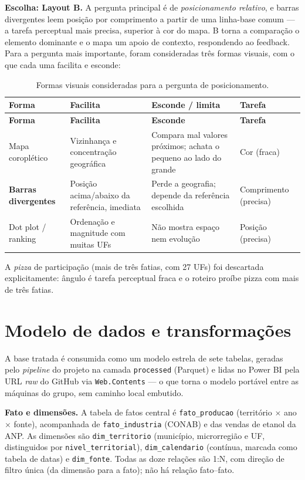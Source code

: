 \documentclass[11pt,a4paper]{article}
\begin{document}
\textbf{Escolha: Layout B.} A pergunta principal é de \textit{posicionamento relativo}, e barras
divergentes leem posição por comprimento a partir de uma linha-base comum — a tarefa perceptual
mais precisa, superior à cor do mapa. B torna a comparação o elemento dominante e o mapa um apoio
de contexto, respondendo ao feedback. Para a pergunta mais importante, foram consideradas três
formas visuais, com o que cada uma facilita e esconde:

\begin{longtable}{L{3.2cm} L{4.2cm} L{4.2cm} L{2.6cm}}
\caption{Formas visuais consideradas para a pergunta de posicionamento.}\\
\toprule
\textbf{Forma} & \textbf{Facilita} & \textbf{Esconde / limita} & \textbf{Tarefa}\\
\midrule
\endfirsthead
\toprule
\textbf{Forma} & \textbf{Facilita} & \textbf{Esconde} & \textbf{Tarefa}\\
\midrule
\endhead
\bottomrule
\endfoot
Mapa coroplético & Vizinhança e concentração geográfica & Compara mal valores próximos; achata o pequeno ao lado do grande & Cor (fraca)\\
\addlinespace
\textbf{Barras divergentes} & Posição acima/abaixo da referência, imediata & Perde a geografia; depende da referência escolhida & Comprimento (precisa)\\
\addlinespace
Dot plot / ranking & Ordenação e magnitude com muitas UFs & Não mostra espaço nem evolução & Posição (precisa)\\
\end{longtable}

A \textit{pizza} de participação (mais de três fatias, com 27 UFs) foi descartada explicitamente:
ângulo é tarefa perceptual fraca e o roteiro proíbe pizza com mais de três fatias.

\section{Modelo de dados e transformações}

A base tratada é consumida como um modelo estrela de sete tabelas, geradas pelo \textit{pipeline}
do projeto na camada \texttt{processed} (Parquet) e lidas no Power BI pela URL \textit{raw} do
GitHub via \texttt{Web.Contents} — o que torna o modelo portável entre as máquinas do grupo, sem
caminho local embutido.

\textbf{Fato e dimensões.} A tabela de fatos central é \texttt{fato\_producao} (território $\times$
ano $\times$ fonte), acompanhada de \texttt{fato\_industria} (CONAB) e das vendas de etanol da ANP.
As dimensões são \texttt{dim\_territorio} (município, microrregião e UF, distinguidos por
\texttt{nivel\_territorial}), \texttt{dim\_calendario} (contínua, marcada como tabela de datas) e
\texttt{dim\_fonte}. Todas as doze relações são 1:N, com direção de filtro única (da dimensão para
a fato); não há relação fato–fato.
\end{document}

